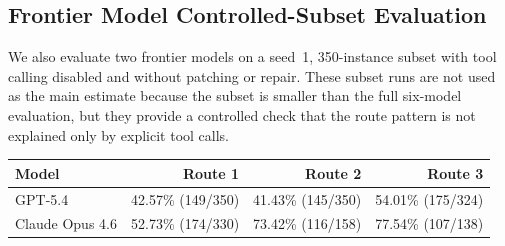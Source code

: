 \subsection{Frontier Model Controlled-Subset Evaluation}
\label{app:frontier_model_sanity_checks}

We also evaluate two frontier models on a seed~1, 350-instance subset with
tool calling disabled and without patching or repair. These subset runs are not
used as the main estimate because the subset is smaller than the full six-model
evaluation, but they provide a controlled check that the route pattern is not
explained only by explicit tool calls.

\begin{center}
\small
\begin{tabular*}{\textwidth}{@{\extracolsep{\fill}}lrrr@{}}
\toprule
Model & Route 1 & Route 2 & Route 3 \\
\midrule
GPT-5.4 & 42.57\% (149/350) & 41.43\% (145/350) & 54.01\% (175/324) \\
Claude Opus 4.6 & 52.73\% (174/330) & 73.42\% (116/158) & 77.54\% (107/138) \\
\bottomrule
\end{tabular*}
\label{tab:appendix_frontier_nopatch}
\end{center}

